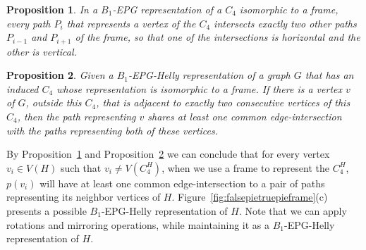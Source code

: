\documentclass[9pt]{entcs}
\newtheorem{pro}{Proposition}[section]
\newtheorem{prove}{Proof}[section]
\begin{document}
\begin{pro}\label{lem:direcoesdiferentes}
In a $B_1$-EPG representation of a $C_4$ isomorphic to a frame, every path $P_i$ that represents a vertex of the $C_4$ intersects exactly two other paths $P_{i-1}$ and $P_{i+1}$ of the frame, so that one of the intersections is horizontal and the other is vertical. %
\end{pro}


\begin{pro}\label{lem:mesmaretasuporte}
Given a $B_1$-EPG-Helly representation of a graph $G$ that has an induced $C_4$ whose representation is isomorphic to a frame. If there is a vertex $v$ of $G$, outside this $C_4$, that is adjacent to exactly two consecutive vertices of this $C_4$, then the path representing $v$ shares at least one common edge-intersection with the paths representing both of these vertices.%
\end{pro}



By Proposition~\ref{lem:direcoesdiferentes} and Proposition~\ref{lem:mesmaretasuporte} we can conclude that for every vertex $v_i \in V(H)$ such that $v_i \neq V(C_4^{H})$, when we use a frame to represent the $C_4^{H}$, $p(v_i)$ will have at least one common edge-intersection to a pair of paths representing its neighbor vertices of $H$. 
Figure~\ref{fig:falsepietruepieframe}(c) presents a possible $B_{1}$-EPG-Helly representation of $H$. 
Note that we can apply rotations and mirroring operations, while maintaining it as a $B_1$-EPG-Helly representation of $H$.
\end{document}
